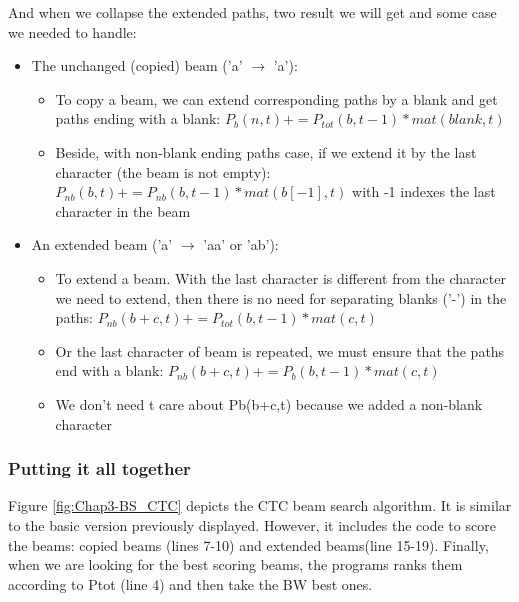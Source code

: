 And when we collapse the extended paths, two result we will get and some case we needed to handle:
\begin{itemize}
	\item The unchanged (copied) beam ('a' $ \rightarrow $ 'a'):
	      \begin{itemize}
		      \item To copy a beam, we can extend corresponding paths by a blank and get
		            paths ending with a blank: $ P_b (n, t) += P_{tot}(b, t-1)*mat(blank, t) $
		      \item Beside, with non-blank ending paths case, if we extend it by the last
		            character (the beam is not empty): $ P_{nb}(b,t) += P_{nb}(b,t-1)*mat(b[-1],t) $
		            with -1 indexes the last character in the beam
	      \end{itemize}
	\item An extended beam ('a' $\rightarrow$ 'aa' or 'ab'):
	      \begin{itemize}
		      \item To extend a beam. With the last character is different from the character we need
		            to extend, then there is no need for separating blanks ('-') in the paths:
		            $ P_{nb}(b+c,t) += P_{tot}(b,t-1)*mat(c,t) $
		      \item Or the last character of beam is repeated, we must ensure that the paths
		            end with a blank: $ P_{nb}(b+c,t) += P_b(b,t-1)*mat(c,t) $
		      \item We don't need t care about Pb(b+c,t) because we added a non-blank character
	      \end{itemize}
\end{itemize}

\subsubsection{Putting it all together}
Figure \ref{fig:Chap3-BS_CTC} depicts the CTC beam search algorithm. It is similar to the basic version
previously displayed. However, it includes the code to score the beams: copied beams
(lines 7-10) and extended beams(line 15-19). Finally, when we are looking for the best scoring
beams, the programs ranks them according to Ptot (line 4) and then take the BW best ones.

